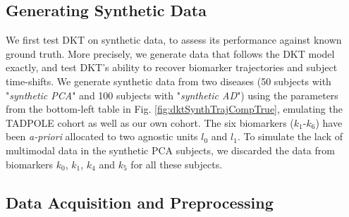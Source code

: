 \documentclass{llncs}
\DeclareMathOperator*{\argmin}{arg\,min}
\begin{document}



\subsection{Generating Synthetic Data}
\label{sec:dktMetSyn}

We first test DKT on synthetic data, to assess its performance against known ground truth. More precisely, we generate data that follows the DKT model exactly, and test DKT's ability to recover biomarker trajectories and subject time-shifts. We generate synthetic data from two diseases (50 subjects with "\emph{synthetic PCA}" and 100 subjects with "\emph{synthetic AD}") using the parameters from the bottom-left table in Fig. \ref{fig:dktSynthTrajCompTrue}, emulating the TADPOLE cohort as well as our own cohort. The six biomarkers ($k_1$-$k_6$) have been \emph{a-priori} allocated to two agnostic units $l_0$ and $l_1$. To simulate the lack of multimodal data in the synthetic PCA subjects, we discarded the data from biomarkers $k_0$, $k_1$, $k_4$ and $k_5$ for all these subjects. 



\subsection{Data Acquisition and Preprocessing}
\end{document}

